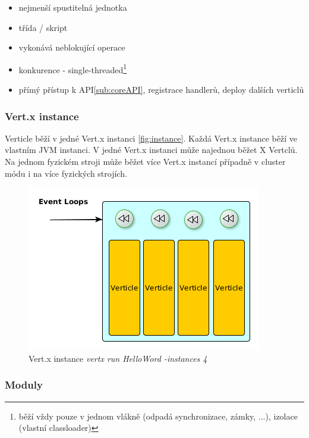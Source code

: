\begin{itemize}
\item nejmenší spustitelná jednotka
\item třída / skript
\item vykonává neblokující operace
\item konkurence - single-threaded\footnote{běží vždy pouze v jednom vlákně (odpadá synchronizace, zámky, ...), izolace (vlastní classloader)}
\item přímý přístup k API\ref{sub:coreAPI}, registrace handlerů, deploy dalších verticlů
\end{itemize}

\subsubsection{Vert.x instance}

Verticle běží v jedné Vert.x instanci \vref{fig:instance}. Každá Vert.x instance běží ve vlastním JVM instanci. V jedné Vert.x instanci může najednou běžet X Vertclů. Na jednom fyzickém stroji může běžet více Vert.x instancí případně v cluster módu i na více fyzických strojích.

\begin{figure}
\begin{centering}
\includegraphics[scale=0.5]{obrazky/instance4}
\par\end{centering}
\caption{Vert.x instance \emph{vertx run HelloWord -instances 4} \label{fig:instance4}}
\end{figure}



\subsubsection{Moduly}\label{sub:moduly}

